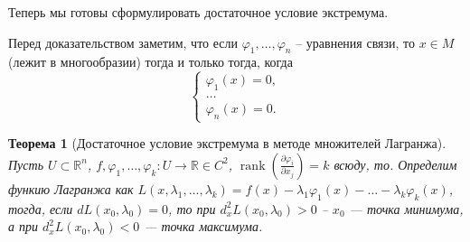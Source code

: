 \documentclass[a5paper]{article}
\newcounter{through}
\theoremstyle{plain}
\newtheorem{theorem}[through]{Теорема}
\theoremstyle{definition}
\numberwithin{through}{section}
\numberwithin{equation}{section}
\DeclareMathOperator{\rank}{rank}
\begin{document}
Теперь мы готовы сформулировать достаточное условие экстремума.

Перед доказательством заметим, что если $\varphi_1,\ldots, \varphi_n$ -- уравнения связи, то $x \in M$ (лежит в многообразии) тогда и только тогда, когда 
\begin{equation*}
\begin{cases}
\varphi_1(x) = 0,
\\
\ldots
\\
\varphi_n(x) = 0.
\end{cases}
\end{equation*}


\begin{theorem}[Достаточное условие экстремума в методе множителей Лагранжа]
	Пусть $U \subset \mathbb{R}^n$, $f, \varphi_1,\ldots, \varphi_k: U \to \mathbb{R} \in C^2$, 
	$\rank \left(\frac{\partial \varphi_i}{\partial x_j}\right) = k$ всюду, то. Определим функию Лагранжа как
	$L(x, \lambda_1,\ldots, \lambda_k) = f(x) - \lambda_1\varphi_1(x) - \ldots - \lambda_k \varphi_k(x) $, тогда,
	если $dL(x_0,\lambda_0) = 0$, то при $d_x^2L(x_0, \lambda_0) > 0$ -- $x_0$ --- точка минимума, а при
	$d_x^2 L(x_0, \lambda_0) < 0 $  --- точка максимума.
\end{theorem}
\end{document}
